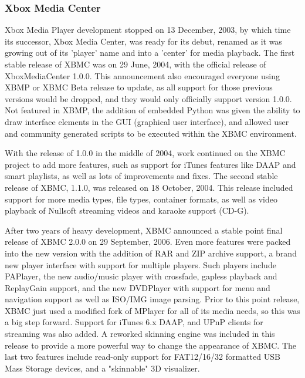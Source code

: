 \documentclass[12pt]{report}
\begin{document}
\subsubsection*{Xbox Media Center}
Xbox Media Player development stopped on 13 December, 2003, by which time its successor, Xbox Media Center, was ready for its debut, renamed as it was growing out of its 'player' name and into a 'center' for media playback. The first stable release of XBMC was on 29 June, 2004, with the official release of XboxMediaCenter 1.0.0. This announcement also encouraged everyone using XBMP or XBMC Beta release to update, as all support for those previous versions would be dropped, and they would only officially support version 1.0.0. Not featured in XBMP, the addition of embedded Python was given the ability to draw interface elements in the GUI (graphical user interface), and allowed user and community generated scripts to be executed within the XBMC environment.\par


\vspace{\baselineskip}
With the release of 1.0.0 in the middle of 2004, work continued on the XBMC project to add more features, such as support for iTunes features like DAAP and smart playlists, as well as lots of improvements and fixes. The second stable release of XBMC, 1.1.0, was released on 18 October, 2004. This release included support for more media types, file types, container formats, as well as video playback of Nullsoft streaming videos and karaoke support (CD-G).\par


\vspace{\baselineskip}
After two years of heavy development, XBMC announced a stable point final release of XBMC 2.0.0 on 29 September, 2006. Even more features were packed into the new version with the addition of RAR and ZIP archive support, a brand new player interface with support for multiple players. Such players include PAPlayer, the new audio/music player with crossfade, gapless playback and ReplayGain support, and the new DVDPlayer with support for menu and navigation support as well as ISO/IMG image parsing. Prior to this point release, XBMC just used a modified fork of MPlayer for all of its media needs, so this was a big step forward. Support for iTunes 6.x DAAP, and UPnP clients for streaming was also added. A reworked skinning engine was included in this release to provide a more powerful way to change the appearance of XBMC. The last two features include read-only support for FAT12/16/32 formatted USB Mass Storage devices, and a "skinnable" 3D visualizer.\par
\end{document}

